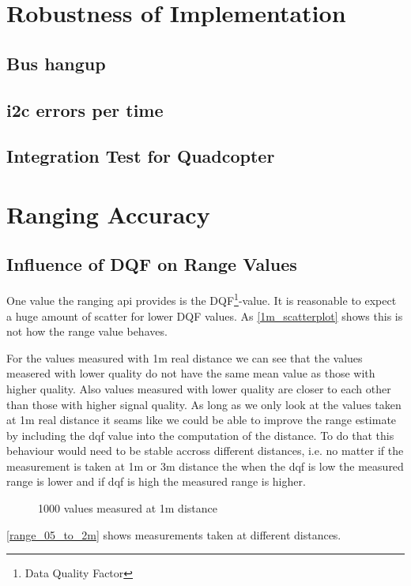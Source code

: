 
\section{Robustness of Implementation}
\subsection{Bus hangup}

\subsection{i2c errors per time}

\subsection{Integration Test for Quadcopter}


\section{Ranging Accuracy}

\subsection{Influence of DQF on Range Values}
One value the ranging api provides is the DQF\footnote{Data Quality Factor}-value.
It is reasonable to expect a huge amount of scatter for lower DQF values.
As \autoref{1m_scatterplot} shows this is not how the range value behaves.

For the values measured with 1m real distance we can see that the values measered with lower quality do not have the same mean value as those with higher quality.
Also values measured with lower quality are closer to each other than those with higher signal quality.
As long as we only look at the values taken at 1m real distance it seams like we could be able to improve the range estimate by including the dqf value into the computation of the distance.
To do that this behaviour would need to be stable accross different distances, i.e. no matter if the measurement is taken at 1m or 3m distance the when the dqf is low the measured range is lower and if dqf is high the measured range is higher.
\begin{figure}[H]
	\centering
	
	\caption{1000 values measured at 1m distance}
	\label{1m_scatterplot}
\end{figure}

\autoref{range_05_to_2m} shows measurements taken at different distances.

